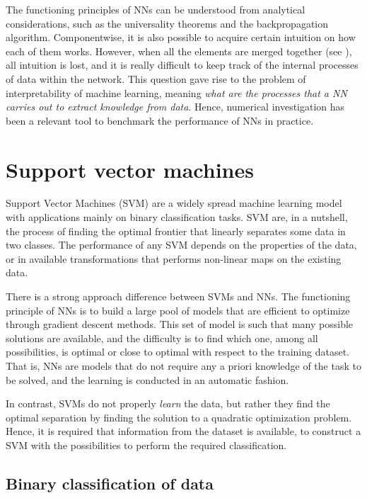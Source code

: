\documentclass[]{report}
\begin{document}
The functioning principles of NNs can be understood from analytical considerations, such as the universality theorems and the backpropagation algorithm. Componentwise, it is also possible to acquire certain intuition on how each of them works. However, when all the elements are merged together (see ), all intuition is lost, and it is really difficult to keep track of the internal processes of data within the network. This question gave rise to the problem of interpretability of machine learning, meaning \textit{what are the processes that a NN carries out to extract knowledge from data}. 
Hence, numerical investigation has been a relevant tool to benchmark the performance of NNs in practice. 

\section{Support vector machines}\label{sec.support-vector-machines}

Support Vector Machines (SVM) are a widely spread machine learning model with applications mainly on binary classification tasks. SVM are, in a nutshell, the process of finding the optimal frontier that linearly separates some data in two classes. The performance of any SVM depends on the properties of the data, or in available transformations that performs non-linear maps on the existing data. 

There is a strong approach difference between SVMs and NNs. The functioning principle of NNs is to build a large pool of models that are efficient to optimize through gradient descent methods. This set of model is such that many possible solutions are available, and the difficulty is to find which one, among all possibilities, is optimal or close to optimal with respect to the training dataset. That is, NNs are models that do not require any a priori knowledge of the task to be solved, and the learning is conducted in an automatic fashion. 

In contrast, SVMs do not properly \textit{learn} the data, but rather they find the optimal separation by finding the solution to a quadratic optimization problem. Hence, it is required that information from the dataset is available, to construct a SVM with the possibilities to perform the required classification. 

\subsection{Binary classification of data}
\end{document}
